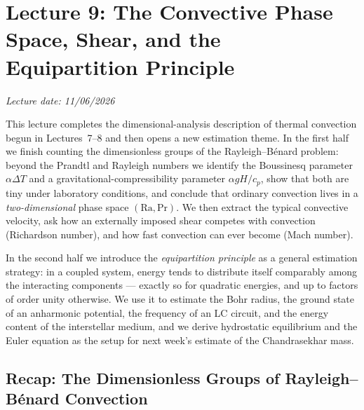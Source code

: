 \section{Lecture 9: The Convective Phase Space, Shear, and the Equipartition Principle}
\label{sec:lec09}
\date{11/06/2026}

\begin{center}
    \textit{Lecture date: 11/06/2026}
\end{center}

This lecture completes the dimensional-analysis description of thermal
convection begun in Lectures~7--8 and then opens a new estimation theme. In the
first half we finish counting the dimensionless groups of the
Rayleigh--B\'enard problem: beyond the Prandtl and Rayleigh numbers we identify
the Boussinesq parameter $\alpha\Delta T$ and a gravitational-compressibility
parameter $\alpha gH/c_p$, show that both are tiny under laboratory conditions,
and conclude that ordinary convection lives in a \emph{two-dimensional} phase
space $(\mathrm{Ra},\mathrm{Pr})$. We then extract the typical convective
velocity, ask how an externally imposed shear competes with convection
(Richardson number), and how fast convection can ever become (Mach number).

In the second half we introduce the \emph{equipartition principle} as a general
estimation strategy: in a coupled system, energy tends to distribute itself
comparably among the interacting components --- exactly so for quadratic
energies, and up to factors of order unity otherwise. We use it to estimate the
Bohr radius, the ground state of an anharmonic potential, the frequency of an
LC circuit, and the energy content of the interstellar medium, and we derive
hydrostatic equilibrium and the Euler equation as the setup for next week's
estimate of the Chandrasekhar mass.


\subsection{Recap: The Dimensionless Groups of Rayleigh--B\'enard Convection}
\label{sec:lec09:recap}

